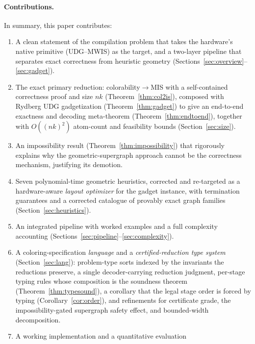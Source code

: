 \documentclass[11pt]{article}
\theoremstyle{definition}
\theoremstyle{remark}
\begin{document}
\paragraph{Contributions.} In summary, this paper contributes:
\begin{enumerate}[label=(\arabic*),leftmargin=2.2em]
  \item A clean statement of the compilation problem that takes the hardware's
        native primitive (UDG--MWIS) as the target, and a two-layer pipeline that
        separates exact correctness from heuristic geometry
        (Sections~\ref{sec:overview}--\ref{sec:gadget}).
  \item The exact primary reduction: colorability$\to$MIS with a self-contained
        correctness proof and size $nk$ (Theorem~\ref{thm:col2is}), composed with
        Rydberg UDG gadgetization (Theorem~\ref{thm:gadget}) to give an end-to-end
        exactness and decoding meta-theorem (Theorem~\ref{thm:endtoend}), together
        with $O((nk)^2)$ atom-count and feasibility bounds
        (Section~\ref{sec:size}).
  \item An impossibility result (Theorem~\ref{thm:impossibility}) that rigorously
        explains why the geometric-supergraph approach cannot be the correctness
        mechanism, justifying its demotion.
  \item Seven polynomial-time geometric heuristics, corrected and re-targeted as a
        hardware-aware \emph{layout optimizer} for the gadget instance, with
        termination guarantees and a corrected catalogue of provably exact graph
        families (Section~\ref{sec:heuristics}).
  \item An integrated pipeline with worked examples and a full complexity
        accounting (Sections~\ref{sec:pipeline}--\ref{sec:complexity}).
  \item A coloring-specification \emph{language} and a \emph{certified-reduction
        type system} (Section~\ref{sec:lang}): problem-type sorts indexed by the
        invariants the reductions preserve, a single decoder-carrying reduction
        judgment, per-stage typing rules whose composition is the soundness theorem
        (Theorem~\ref{thm:typesound}), a corollary that the legal stage order is
        forced by typing (Corollary~\ref{cor:order}), and refinements for
        certificate grade, the impossibility-gated supergraph safety effect, and
        bounded-width decomposition.
  \item A working implementation and a quantitative evaluation

\end{enumerate}
\end{document}
